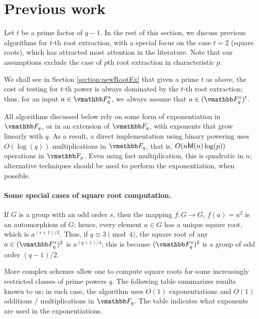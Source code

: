\section{Previous work}

Let $t$ be a prime factor of $q-1$.  In the rest of this section, we
discuss previous algorithms for $t$-th root extraction, with a special
focus on the case $t=2$ (square roots), which has attracted most
attention in the literature. Note that our assumptions exclude the
case of $p$th root extraction in characteristic $p$.


We shall see in Section \ref{section:newRootEx} that given a prime $t$
as above, the cost of testing for $t$-th power is always dominated by
the $t$-th root extraction; thus, for an input $a \in \F_q^*$, we
always assume that $a \in (\F_q^*)^t$.

All algorithms discussed below rely on some form of exponentiation in
$\F_q$, or in an extension of $\F_q$, with exponents that grow
linearly with $q$. As a result, a direct implementation using binary
powering uses $O(\log(q))$ multiplications in $\F_q$, that is,
$O(n\mathsf{M}(n)\log(p))$ operations in $\F_p$. Even using fast
multiplication, this is quadratic in $n$; alternative techniques
should be used to perform the exponentiation, when possible.

\paragraph{Some special cases of square root computation.}
If $G$ is a group with an odd order $s$, then the mapping $f: G
\rightarrow G$, $f(a) = a^2$ is an automorphism of $G$; hence, every
element $a \in G$ has a unique square root, which is $a^{(s +
  1)/2}$. Thus, if $q \equiv 3 \pmod 4$, the square root of any $a \in
(\F_q^*)^2$ is $a^{(q + 1) / 4}$; this is because $(\F_q^*)^2$ is a
group of odd order $(q - 1) / 2$.

More complex schemes allow one to compute square roots for some
increasingly restricted classes of prime powers $q$. The following
table summarizes results known to us; in each case, the algorithm uses
$O(1)$ exponentiations and $O(1)$ additions / multiplications in
$\F_q$. The table indicates what exponents are used in the
exponentiations.

